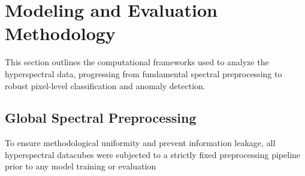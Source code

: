 \section{Modeling and Evaluation Methodology}
\label{sec:modeling_evaluation}

\noindent
This section outlines the computational frameworks used to analyze the hyperspectral data, progressing from fundamental spectral preprocessing to robust pixel-level classification and anomaly detection.

\subsection{Global Spectral Preprocessing}
\label{subsec:global_preprocessing}

\noindent
To ensure methodological uniformity and prevent information leakage, all hyperspectral
datacubes were subjected to a strictly fixed preprocessing pipeline prior to any model
training or evaluation


